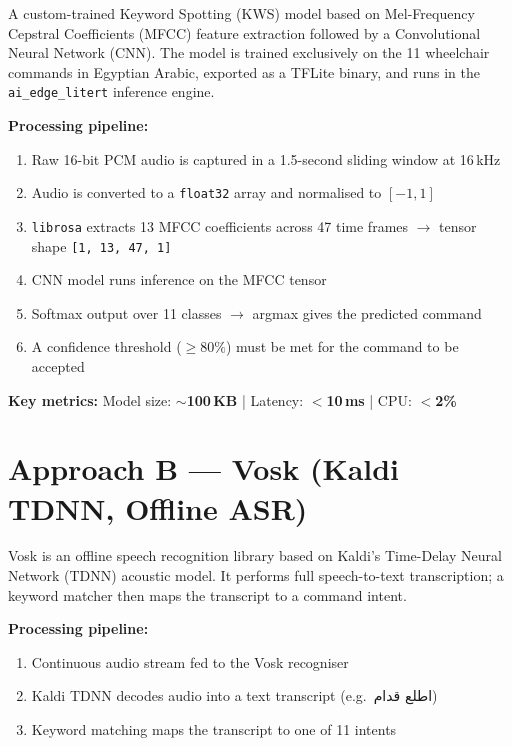 \documentclass[12pt, a4paper]{report}
\begin{document}
A custom-trained Keyword Spotting (KWS) model based on Mel-Frequency Cepstral
Coefficients (MFCC) feature extraction followed by a Convolutional Neural Network (CNN).
The model is trained exclusively on the 11 wheelchair commands in Egyptian Arabic,
exported as a TFLite binary, and runs in the \texttt{ai\_edge\_litert} inference engine.

\textbf{Processing pipeline:}
\begin{enumerate}[noitemsep]
  \item Raw 16-bit PCM audio is captured in a 1.5-second sliding window at 16\,kHz
  \item Audio is converted to a \texttt{float32} array and normalised to $[-1, 1]$
  \item \texttt{librosa} extracts 13 MFCC coefficients across 47 time frames
        $\rightarrow$ tensor shape \texttt{[1, 13, 47, 1]}
  \item CNN model runs inference on the MFCC tensor
  \item Softmax output over 11 classes $\rightarrow$ argmax gives the predicted command
  \item A confidence threshold ($\geq 80\%$) must be met for the command to be accepted
\end{enumerate}

\begin{mdframed}[backgroundcolor=lightblue, linecolor=steelblue, linewidth=1pt]
\textbf{Key metrics:} \quad
Model size: \textbf{$\sim$100\,KB} \quad|\quad
Latency: \textbf{$<$10\,ms} \quad|\quad
CPU: \textbf{$<$2\%}
\end{mdframed}

\section{Approach B --- Vosk (Kaldi TDNN, Offline ASR)}

Vosk is an offline speech recognition library based on Kaldi's Time-Delay Neural
Network (TDNN) acoustic model. It performs full speech-to-text transcription; a keyword
matcher then maps the transcript to a command intent.

\textbf{Processing pipeline:}
\begin{enumerate}[noitemsep]
  \item Continuous audio stream fed to the Vosk recogniser
  \item Kaldi TDNN decodes audio into a text transcript (e.g.\ \textarabic{اطلع قدام})
  \item Keyword matching maps the transcript to one of 11 intents
\end{enumerate}
\end{document}
